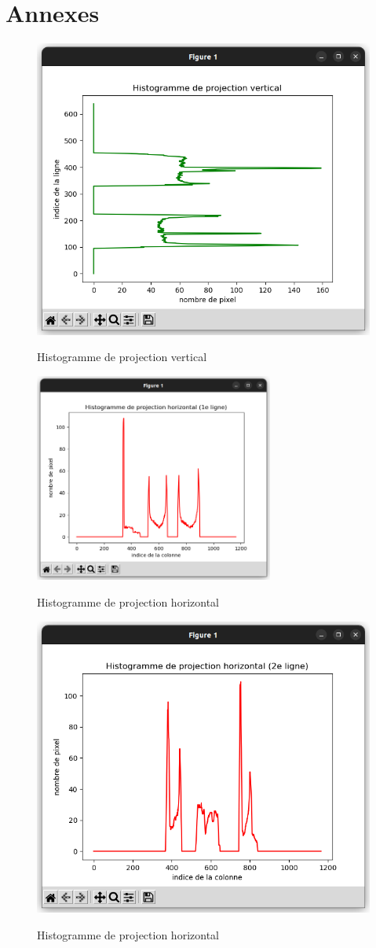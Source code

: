 \documentclass[a4paper]{article}
\begin{document}
	\section*{Annexes}
		\begin{figure}
			\caption{Histogramme de projection vertical}
			\includegraphics[width=.7\textwidth]{histoY.png}
			\centering
			\label{fig:histoY}
		\end{figure}
		\begin{figure}
			\caption{Histogramme de projection horizontal}
			\includegraphics[width=0.7\textwidth]{histoX1.png}
			\centering
			\label{fig:histoX1}
		\end{figure}
		\begin{figure}
			\caption{Histogramme de projection horizontal}
			\includegraphics[width=.7\textwidth]{histoX2.png}
			\centering
			\label{fig:histoX2}
		\end{figure}
\end{document}
